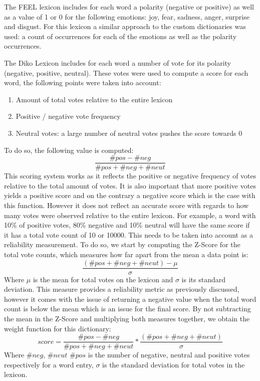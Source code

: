 The FEEL lexicon includes for each word a polarity (negative or positive) as well as a value of 1 or 0 for the following emotions: joy, fear, sadness, anger, surprise and disgust. For this lexicon a similar approach to the custom dictionaries was used: a count of occurrences for each of the emotions as well as the polarity occurrences.

The Diko Lexicon includes for each word a number of vote for its polarity (negative, positive, neutral). These votes were used to compute a score for each word, the following points were taken into account:
\begin{enumerate}
    \item Amount of total votes relative to the entire lexicon
    \item Positive / negative vote frequency
    \item Neutral votes: a large number of neutral votes pushes the score towards 0
\end{enumerate}
To do so, the following value is computed:
\begin{equation}
    \frac{\#pos - \#neg}{\#pos + \#neg + \#neut}
\end{equation}
This scoring system works as it reflects the positive or negative frequency of votes relative to the total amount of votes. It is also important that more positive votes yields a positive score and on the contrary a negative score which is the case with this function. However it does not reflect an accurate score with regards to how many votes were observed relative to the entire lexicon. For example, a word with 10\% of positive votes, 80\% negative and 10\% neutral will have the same score if it has a total vote count of 10 or 10000. This needs to be taken into account as a reliability measurement.
To do so, we start by computing the Z-Score for the total vote counts, which measures how far apart from the mean a data point is:
\begin{equation}
    \frac{(\#pos + \#neg + \#neut) - \mu}{\sigma}
\end{equation}
Where $\mu$ is the mean for total votes on the lexicon and $\sigma$ is its standard deviation. This measure provides a reliability metric as previously discussed, however it comes with the issue of returning a negative value when the total word count is below the mean which is an issue for the final score. By not subtracting the mean in the Z-Score and multiplying both measures together, we obtain the weight function for this dictionary:
\begin{equation}
\label{diko score}
    score = \frac{\#pos - \#neg}{\#pos + \#neg + \#neut} * \frac{(\#pos + \#neg + \#neut)}{\sigma}
\end{equation}
Where $\#neg$, $\#neut$ $\#pos$ is the number of negative, neutral and positive votes respectively for a word entry, $\sigma$ is the standard deviation for total votes in the lexicon.

